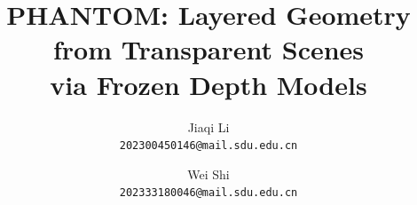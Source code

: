 \documentclass[10pt,twocolumn,letterpaper]{article}
\title{PHANTOM: Layered Geometry from Transparent Scenes\\via Frozen Depth Models}
\author{Jiaqi Li\\
{\tt\small 202300450146@mail.sdu.edu.cn}
\and
Wei Shi\\
{\tt\small 202333180046@mail.sdu.edu.cn}
}
\begin{document}
\maketitle

    






% 
% 
{
    \small
    
    
}

% 
\end{document}
